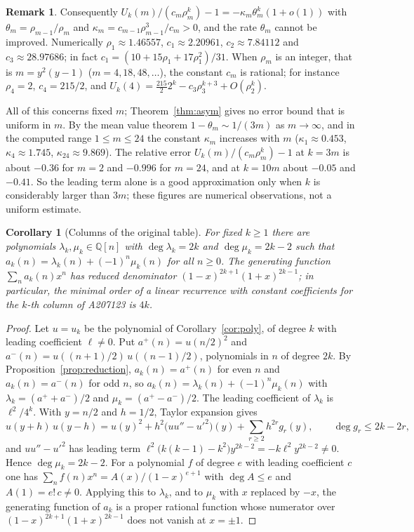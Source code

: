 \documentclass[11pt]{amsart}
\newtheorem{corollary}[theorem]{Corollary}
\theoremstyle{definition}
\newtheorem{remark}[theorem]{Remark}
\newcommand{\Q}{\mathbb{Q}}
\begin{document}
\begin{remark}\label{rem:asym}
Consequently $U_k(m)/(c_m\rho_m^k)-1=-\kappa_m\theta_m^k(1+o(1))$ with $\theta_m=\rho_{m-1}/\rho_m$ and $\kappa_m=c_{m-1}\rho_{m-1}^3/c_m>0$, and the rate $\theta_m$ cannot be improved. Numerically $\rho_1\approx1.46557$, $c_1\approx2.20961$, $c_2\approx7.84112$ and $c_3\approx28.97686$; in fact $c_1=(10+15\rho_1+17\rho_1^2)/31$. When $\rho_m$ is an integer, that is $m=y^2(y-1)$ ($m=4,18,48,\dots$), the constant $c_m$ is rational; for instance $\rho_4=2$, $c_4=215/2$, and $U_k(4)=\tfrac{215}{2}2^k-c_3\rho_3^{k+3}+O(\rho_2^k)$.

All of this concerns fixed $m$; Theorem~\ref{thm:asym} gives no error bound that is uniform in $m$. By the mean value theorem $1-\theta_m\sim1/(3m)$ as $m\to\infty$, and in the computed range $1\le m\le24$ the constant $\kappa_m$ increases with $m$ ($\kappa_1\approx0.453$, $\kappa_4\approx1.745$, $\kappa_{24}\approx9.869$). The relative error $U_k(m)/(c_m\rho_m^k)-1$ at $k=3m$ is about $-0.36$ for $m=2$ and $-0.996$ for $m=24$, and at $k=10m$ about $-0.05$ and $-0.41$. So the leading term alone is a good approximation only when $k$ is considerably larger than $3m$; these figures are numerical observations, not a uniform estimate.
\end{remark}

\begin{corollary}[Columns of the original table]\label{cor:columns}
For fixed $k\ge1$ there are polynomials $\lambda_k,\mu_k\in\Q[n]$ with $\deg\lambda_k=2k$ and $\deg\mu_k=2k-2$ such that $a_k(n)=\lambda_k(n)+(-1)^n\mu_k(n)$ for all $n\ge0$. The generating function $\sum_na_k(n)x^n$ has reduced denominator $(1-x)^{2k+1}(1+x)^{2k-1}$; in particular, the minimal order of a linear recurrence with constant coefficients for the $k$-th column of A207123 is $4k$.
\end{corollary}

\begin{proof}
Let $u=u_k$ be the polynomial of Corollary~\ref{cor:poly}, of degree $k$ with leading coefficient $\ell\ne0$. Put $a^+(n)=u(n/2)^2$ and $a^-(n)=u((n+1)/2)\,u((n-1)/2)$, polynomials in $n$ of degree $2k$. By Proposition~\ref{prop:reduction}, $a_k(n)=a^+(n)$ for even $n$ and $a_k(n)=a^-(n)$ for odd $n$, so $a_k(n)=\lambda_k(n)+(-1)^n\mu_k(n)$ with $\lambda_k=(a^++a^-)/2$ and $\mu_k=(a^+-a^-)/2$. The leading coefficient of $\lambda_k$ is $\ell^2/4^k$. With $y=n/2$ and $h=1/2$, Taylor expansion gives
\[
  u(y+h)\,u(y-h)=u(y)^2+h^2\bigl(uu''-u'^2\bigr)(y)+\sum_{r\ge2}h^{2r}g_r(y),\qquad\deg g_r\le2k-2r,
\]
and $uu''-u'^2$ has leading term $\ell^2\bigl(k(k-1)-k^2\bigr)y^{2k-2}=-k\ell^2y^{2k-2}\ne0$. Hence $\deg\mu_k=2k-2$. For a polynomial $f$ of degree $e$ with leading coefficient $c$ one has $\sum_nf(n)x^n=A(x)/(1-x)^{e+1}$ with $\deg A\le e$ and $A(1)=e!\,c\ne0$. Applying this to $\lambda_k$, and to $\mu_k$ with $x$ replaced by $-x$, the generating function of $a_k$ is a proper rational function whose numerator over $(1-x)^{2k+1}(1+x)^{2k-1}$ does not vanish at $x=\pm1$.
\end{proof}
\end{document}
